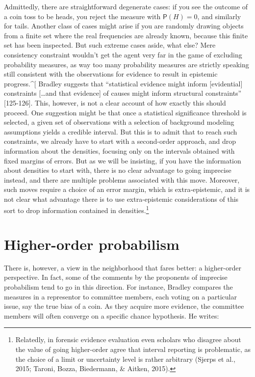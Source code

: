 \documentclass[
  10pt,
  dvipsnames,enabledeprecatedfontcommands]{scrartcl}
\begin{document}
Admittedly, there are straightforward degenerate cases: if you see the
outcome of a coin toss to be heads, you reject the measure with
\(\mathsf{P}(H)=0\), and similarly for tails. Another class of cases
might arise if you are randomly drawing objects from a finite set where
the real frequencies are already known, because this finite set has been
inspected. But such extreme cases aside, what else? Mere consistency
constraint wouldn't get the agent very far in the game of excluding
probability measures, as way too many probability measures are strictly
speaking still consistent with the observations for evidence to result
in epistemic progress.\^{}{[} Bradley suggests that ``statistical
evidence might inform {[}evidential{]} constraints {[}\dots and that
evidence{]} of causes might inform structural constraints''
{[}125-126{]}. This, however, is not a clear account of how exactly this
should proceed. One suggestion might be that once a statistical
significance threshold is selected, a given set of observations with a
selection of background modeling assumptions yields a credible interval.
But this is to admit that to reach such constraints, we already have to
start with a second-order approach, and drop information about the
densities, focusing only on the intervals obtained with fixed margins of
errors. But as we will be insisting, if you have the information about
densities to start with, there is no clear advantage to going imprecise
instead, and there are multiple problems associated with this move.
Moreover, such moves require a choice of an error margin, which is
extra-epistemic, and it is not clear what advantage there is to use
extra-epistemic considerations of this sort to drop information
contained in densities.\footnote{Relatedly, in forensic evidence
  evaluation even scholars who disagree about the value of going
  higher-order agree that interval reporting is problematic, as the
  choice of a limit or uncertainty level is rather arbitrary (Sjerps et
  al., 2015; Taroni, Bozza, Biedermann, \& Aitken, 2015).}

\section{Higher-order probabilism}\label{higher-order-probabilism}

There is, however, a view in the neighborhood that fares better: a
higher-order perspective. In fact, some of the comments by the
proponents of imprecise probabilism tend to go in this direction. For
instance, Bradley compares the measures in a representor to committee
members, each voting on a particular issue, say the true bias of a coin.
As they acquire more evidence, the committee members will often converge
on a specific chance hypothesis. He writes:
\end{document}
